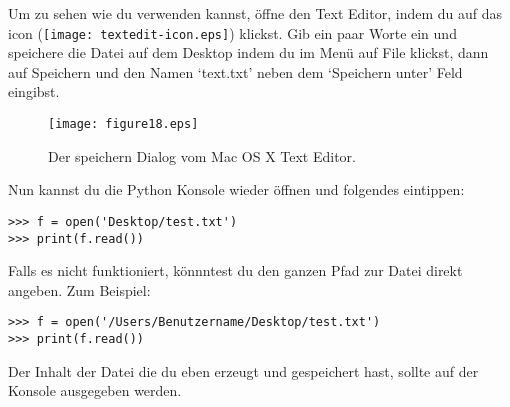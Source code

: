 \begin{MAC}
Um zu sehen wie du  verwenden kannst, öffne den Text Editor, indem du auf das icon (\texttt{[image: textedit-icon.eps]}) klickst. Gib ein paar Worte ein und speichere die Datei auf dem Desktop indem du im Menü auf File klickst, dann auf Speichern und den Namen `text.txt'  neben dem `Speichern unter' Feld eingibst.

\begin{figure}
\begin{center}
\texttt{[image: figure18.eps]}
\end{center}
\caption{Der speichern Dialog vom Mac OS X Text Editor.}\label{fig18}
\end{figure}

Nun kannst du die Python Konsole wieder öffnen und folgendes eintippen:

\begin{Verbatim}[frame=single]
>>> f = open('Desktop/test.txt')
>>> print(f.read())
\end{Verbatim}

Falls es nicht funktioniert, könnntest du den ganzen Pfad zur Datei direkt angeben. Zum Beispiel:

\begin{Verbatim}[frame=single]
>>> f = open('/Users/Benutzername/Desktop/test.txt')
>>> print(f.read())
\end{Verbatim}

Der Inhalt der Datei die du eben erzeugt und gespeichert hast, sollte auf der Konsole ausgegeben werden. %
\end{MAC}

